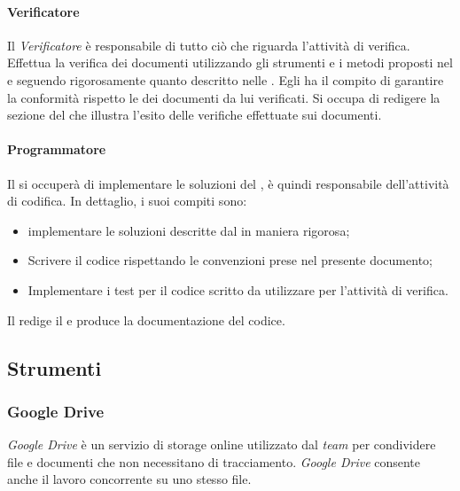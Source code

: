 \paragraph{Verificatore}
Il \textsl{Verificatore} è responsabile di tutto ciò che riguarda l'attività di verifica.
Effettua la verifica dei documenti utilizzando gli strumenti e i metodi proposti nel 
\textsl{\PdQ} e seguendo rigorosamente quanto descritto nelle \textsl{\NdP}.
Egli ha il compito di garantire la conformità rispetto le \textsl{\NdP} dei documenti da lui verificati. 
Si occupa di redigere la sezione del \textsl{\PdQ} che illustra l'esito delle 
verifiche effettuate sui documenti.

\paragraph{Programmatore}
Il \textsl{\Progr} si occuperà di implementare le soluzioni del \textsl{\Prog}, è quindi 
responsabile dell'attività di codifica. In dettaglio, i suoi compiti sono:
\begin{itemize}
  \item implementare le soluzioni descritte dal \textsl{\Prog} in maniera 
  rigorosa;
  \item Scrivere il codice rispettando le convenzioni prese nel presente 
  documento;
  \item Implementare i test per il codice scritto da utilizzare per l'attività 
  di verifica.
\end{itemize}
Il \textsl{\Progr} redige il \textsl{\MU} e produce la documentazione del codice.

\subsection{Strumenti}

\subsubsection{Google Drive}
\textit{Google Drive} è un servizio di storage online utilizzato dal 
\textit{team} per condividere file e documenti che non necessitano di tracciamento. 
\textit{Google Drive} consente anche il lavoro concorrente su uno stesso 
file.

